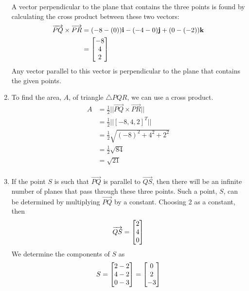 \begin{enumerate}
A vector perpendicular to the plane that contains the three points is found by calculating the cross product between these two vectors:
\begin{align*}
\overrightarrow{PQ} \times \overrightarrow{PR} 
&= (-8-(0))\mathbf{i} - (-4-0)\mathbf{j}+(0-(-2))\mathbf{k} \\
&= \begin{bmatrix} -8 \\ 4 \\ 2 \end{bmatrix}
\end{align*}
Any vector parallel to this vector is perpendicular to the plane that contains the given points. 
\item
To find the area, $A$, of  triangle $\bigtriangleup PQR$, we can use a cross product.
\begin{align*}
A &= \frac{1}{2} \big|\big| \overrightarrow{PQ} \times \overrightarrow{PR} \big|\big| \\
&= \frac{1}{2} \big|\big| [-8,4,2]^T \big|\big| \\
&= \frac{1}{2} \sqrt{ (-8)^2+4^2+2^2} \\
&= \frac{1}{2} \sqrt{ 84} \ \\
&= \sqrt{21} \\
\end{align*}
\item
If the point $S$ is such that $\overrightarrow{PQ}$ is parallel to $\overrightarrow{QS}$, then there will be an infinite number of planes that pass through these three points. Such a point, $S$, can be determined by multiplying $\overrightarrow{PQ}$ by a constant. Choosing 2 as a constant, then 
\begin{align*}
\overrightarrow{QS} &= \begin{bmatrix} 2 \\ 4 \\ 0 \end{bmatrix}\\
\end{align*}
We determine the components of $S$ as
\begin{align*}
S &= \begin{bmatrix} 2-2 \\ 4-2 \\ 0-3 \end{bmatrix} = \begin{bmatrix} 0 \\ 2 \\ -3 \end{bmatrix}\\
\end{align*}
\end{enumerate}

